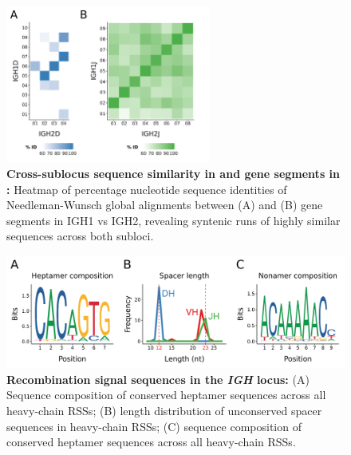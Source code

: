 \begin{figure}
\centering
	\centering
	\begin{subfigure}{0em}
    \label{fig:nfu-dj-alignment-a}
    \end{subfigure}
    \begin{subfigure}{0em}
    \label{fig:nfu-dj-alignment-b}
    \end{subfigure}

\includegraphics[width=0.6\textwidth]{_Figures/png/nfu-dj-aln}
\caption[Cross-sublocus sequence similarity in \dh and \jh gene segments in \Nfu]{\textbf{Cross-sublocus sequence similarity in \dh and \jh gene segments in \Nfu:} Heatmap of percentage nucleotide sequence identities of Needleman-Wunsch global alignments between (A) \dh and (B) \jh gene segments in IGH1 vs IGH2, revealing syntenic runs of highly similar sequences across both subloci.}
\label{fig:nfu-dj-alignment}
\end{figure}	
	
	\begin{figure}
	\centering
	\includegraphics[width=\textwidth]{_Figures/png/nfu-rss-seqlogo-all}
	\caption[Recombination signal sequences in the \Nfu \textit{IGH} locus]{\textbf{Recombination signal sequences in the \Nfu \textit{IGH} locus:} (A) Sequence composition of conserved heptamer sequences across all \Nfu heavy-chain RSSs; (B) length distribution of unconserved spacer sequences in \Nfu heavy-chain RSSs; (C) sequence composition of conserved heptamer sequences across all \Nfu heavy-chain RSSs.}
	\label{fig:nfu-rss-seqlogo-all}
	\end{figure}
	
